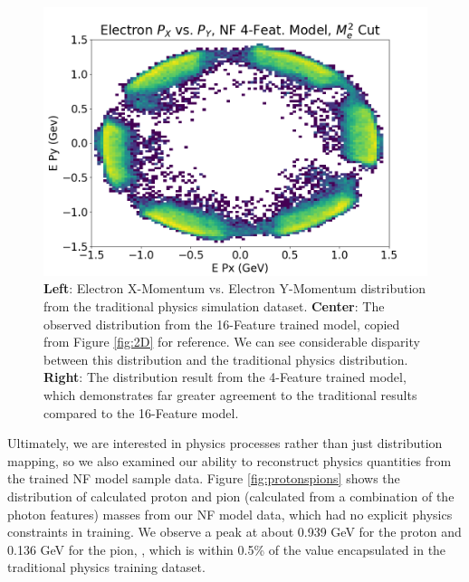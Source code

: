\begin{figure}[htb]
\begin{minipage}{0.1323\textwidth}
        \includegraphics[width=.99\textwidth,trim={0 0 0 0},clip]{Chapters/Ch3-Simulations/normalizing_flows/pics/FinalPictures/2D_Hists_4F/Electron_P_X_vs_P_Y,_NF_4-Feat_Model,_M_e2_Cut.png}
    \end{minipage}
    \caption{\textbf{Left}: Electron X-Momentum vs. Electron Y-Momentum distribution from the traditional physics simulation dataset. \textbf{Center}: The observed distribution from the 16-Feature trained model, copied from Figure \ref{fig:2D} for reference. We can see considerable disparity between this distribution and the traditional physics distribution. \textbf{Right}: The distribution result from the 4-Feature trained model, which demonstrates far greater agreement to the traditional results compared to the 16-Feature model. }
    \label{fig:2D4F}
\end{figure}


Ultimately, we are interested in physics processes rather than just distribution mapping, so we also examined our ability to reconstruct physics quantities from the trained NF model sample data. Figure \ref{fig:protonspions} shows the distribution of calculated proton and pion (calculated from a combination of the photon features) masses from our NF model data, which had no explicit physics constraints in training. We observe a peak at about 0.939 GeV for the proton and 0.136 GeV for the pion, , which is within 0.5\% of the value encapsulated in the traditional physics training dataset. 


\begin{figure}[htb]
    \centering
    

    \label{fig:protons}
\end{figure}



